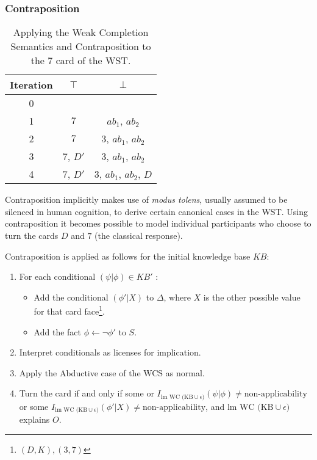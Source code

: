 \subsubsection*{Contraposition}
\begin{table}
\begin{center}
\begin{tabular}{ c c c }
 \textbf{Iteration} & \textbf{$\top$} & \textbf{$\bot$} \\ 
 \hline
 0 &  &  \\  
 1 &  $7$ & $ab_1$, $ab_2$  \\  
 2 &  $7$ & $3$, $ab_1$, $ab_2$  \\
 3 &  $7$, $D'$ & $3$, $ab_1$, $ab_2$  \\
 4 &  $7$, $D'$ & $3$, $ab_1$, $ab_2$, $D$  
\end{tabular}
\caption{Applying the Weak Completion Semantics and Contraposition to the $7$ card of the WST.}
\label{tbl:7cont}
\end{center}
\end{table}

Contraposition implicitly makes use of \textit{modus tolens}, usually assumed to be silenced in human cognition, to derive certain canonical cases in the WST. Using contraposition it becomes possible to model individual participants who choose to turn the cards $D$ and $7$ (the classical response).

Contraposition is applied as follows for the initial knowledge base $KB$:
\begin{enumerate}
\item For each conditional $(\psi|\phi)\in KB'$ :
\begin{itemize}
\item Add the conditional $(\phi'|X)$ to $\Delta$, where $X$ is the other possible value for that card face\footnote{$(D,K),(3,7)$}.
\item Add the fact $\phi\leftarrow \lnot \phi'$ to $S$.
\end{itemize}
\item Interpret conditionals as licenses for implication.
\item Apply the Abductive case of the WCS as normal.
\item Turn the card if and only if some or $I_{\text{lm WC (KB} \cup \epsilon)}(\psi|\phi)\neq\textrm{non-applicability}$ or some $I_{\text{lm WC (KB} \cup \epsilon)}(\phi'|X)\neq\textrm{non-applicability}$, and $\text{lm WC (KB} \cup \epsilon)$ explains $O$.
\end{enumerate}

